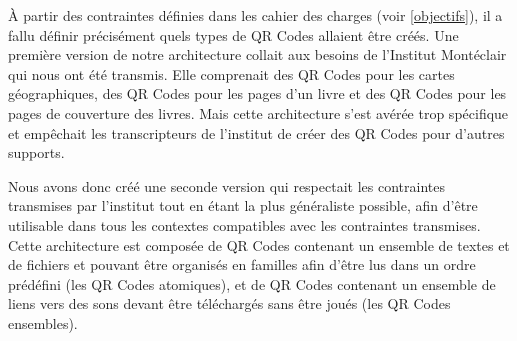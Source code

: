 \par
À partir des contraintes définies dans les cahier des charges (voir \ref{objectifs}), il a fallu définir précisément quels types de QR Codes allaient être créés. Une première version de notre architecture collait aux besoins de l'Institut Montéclair qui nous ont été transmis. Elle comprenait des QR Codes pour les cartes géographiques, des QR Codes pour les pages d'un livre et des QR Codes pour les pages de couverture des livres. Mais cette architecture s'est avérée trop spécifique et empêchait les transcripteurs de l'institut de créer des QR Codes pour d'autres supports.\\

\par
Nous avons donc créé une seconde version qui respectait les contraintes transmises par l'institut tout en étant la plus généraliste possible, afin d'être utilisable dans tous les contextes compatibles avec les contraintes transmises. Cette architecture est composée de QR Codes contenant un ensemble de textes et de fichiers et pouvant être organisés en familles afin d'être lus dans un ordre prédéfini (les QR Codes atomiques), et de QR Codes contenant un ensemble de liens vers des sons devant être téléchargés sans être joués (les QR Codes ensembles).